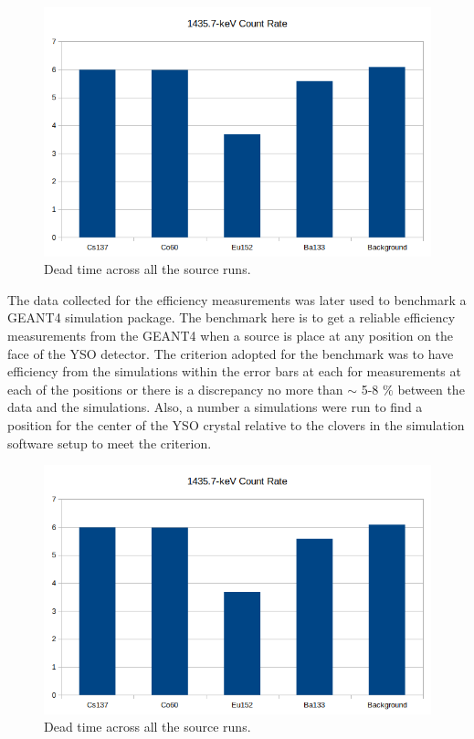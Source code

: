 \begin{figure}[h]
	\centering
	\includegraphics[scale=0.5]{figures/background_count_rate.png}
	\caption[]{Dead time across all the source runs.}
	\label{fig:1435_7_background}
\end{figure}


The data collected for the efficiency measurements was later used to benchmark a GEANT4 simulation package. The 
benchmark here is to get a reliable efficiency measurements from the GEANT4 when a source is place at any position on the face of the YSO detector. The criterion adopted for the benchmark  was to have efficiency from the simulations within the error bars at each for measurements at each of the positions or there is a discrepancy no more than $\sim$ 5-8 $\%$ between the data and the simulations. Also, a number a simulations were run to find a position for the center of the YSO crystal relative to the clovers in the simulation software setup to meet the criterion.

\begin{figure}[h]
	\centering
	\includegraphics[scale=0.5]{figures/background_count_rate.png}
	\caption[]{Dead time across all the source runs.}
	\label{fig:1435_7_background}
\end{figure}









